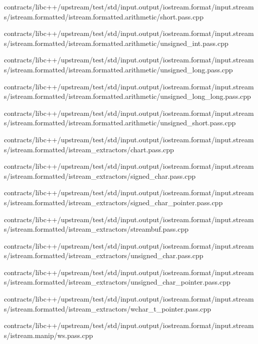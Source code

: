 \begin{DoxyCompactItemize}
contracts/libc++/upstream/test/std/input.\+output/iostream.\+format/input.\+streams/istream.\+formatted/istream.\+formatted.\+arithmetic/short.\+pass.\+cpp\item 
contracts/libc++/upstream/test/std/input.\+output/iostream.\+format/input.\+streams/istream.\+formatted/istream.\+formatted.\+arithmetic/unsigned\+\_\+int.\+pass.\+cpp\item 
contracts/libc++/upstream/test/std/input.\+output/iostream.\+format/input.\+streams/istream.\+formatted/istream.\+formatted.\+arithmetic/unsigned\+\_\+long.\+pass.\+cpp\item 
contracts/libc++/upstream/test/std/input.\+output/iostream.\+format/input.\+streams/istream.\+formatted/istream.\+formatted.\+arithmetic/unsigned\+\_\+long\+\_\+long.\+pass.\+cpp\item 
contracts/libc++/upstream/test/std/input.\+output/iostream.\+format/input.\+streams/istream.\+formatted/istream.\+formatted.\+arithmetic/unsigned\+\_\+short.\+pass.\+cpp\item 
contracts/libc++/upstream/test/std/input.\+output/iostream.\+format/input.\+streams/istream.\+formatted/istream\+\_\+extractors/chart.\+pass.\+cpp\item 
contracts/libc++/upstream/test/std/input.\+output/iostream.\+format/input.\+streams/istream.\+formatted/istream\+\_\+extractors/signed\+\_\+char.\+pass.\+cpp\item 
contracts/libc++/upstream/test/std/input.\+output/iostream.\+format/input.\+streams/istream.\+formatted/istream\+\_\+extractors/signed\+\_\+char\+\_\+pointer.\+pass.\+cpp\item 
contracts/libc++/upstream/test/std/input.\+output/iostream.\+format/input.\+streams/istream.\+formatted/istream\+\_\+extractors/streambuf.\+pass.\+cpp\item 
contracts/libc++/upstream/test/std/input.\+output/iostream.\+format/input.\+streams/istream.\+formatted/istream\+\_\+extractors/unsigned\+\_\+char.\+pass.\+cpp\item 
contracts/libc++/upstream/test/std/input.\+output/iostream.\+format/input.\+streams/istream.\+formatted/istream\+\_\+extractors/unsigned\+\_\+char\+\_\+pointer.\+pass.\+cpp\item 
contracts/libc++/upstream/test/std/input.\+output/iostream.\+format/input.\+streams/istream.\+formatted/istream\+\_\+extractors/wchar\+\_\+t\+\_\+pointer.\+pass.\+cpp\item 
contracts/libc++/upstream/test/std/input.\+output/iostream.\+format/input.\+streams/istream.\+manip/ws.\+pass.\+cpp\item 

\end{DoxyCompactItemize}
